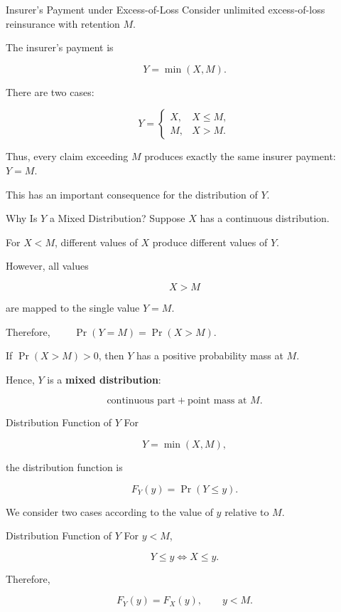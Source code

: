 \documentclass[
  ignorenonframetext,
  aspectratio=169,
]{beamer}
\begin{document}
\begin{frame}{Insurer's Payment under Excess-of-Loss}
\protect{}\label{insurers-payment-under-excess-of-loss-1}
Consider unlimited excess-of-loss reinsurance with retention \(M\).

The insurer's payment is

\[
\boxed{Y=\min(X,M)}.
\]

There are two cases:

\[
Y=
\begin{cases}
X, & X\leq M,\\
M, & X>M.
\end{cases}
\]

Thus, every claim exceeding \(M\) produces exactly the same insurer
payment: \(Y=M.\)

This has an important consequence for the distribution of \(Y\).
\end{frame}

\begin{frame}{Why Is \(Y\) a Mixed Distribution?}
\protect{}\label{why-is-y-a-mixed-distribution}
Suppose \(X\) has a continuous distribution.

For \(X<M\), different values of \(X\) produce different values of
\(Y\).

However, all values

\[
X>M
\]

are mapped to the single value \(Y = M.\)

Therefore, \(\quad \quad \Pr(Y=M)=\Pr(X>M).\)

If \(\Pr(X>M)>0\), then \(Y\) has a positive probability mass at \(M\).

Hence, \(Y\) is a \textbf{mixed distribution}:

\[
\boxed{
\text{continuous part}
+
\text{point mass at }M.
}
\]
\end{frame}

\begin{frame}{Distribution Function of \(Y\)}
\protect{}\label{distribution-function-of-y}
For

\[
Y=\min(X,M),
\]

the distribution function is

\[
F_Y(y)=\Pr(Y\leq y).
\]

We consider two cases according to the value of \(y\) relative to \(M\).
\end{frame}

\begin{frame}{Distribution Function of \(Y\)}
\protect{}\label{distribution-function-of-y-1}
For \(y<M\),

\[
Y\leq y
\iff
X\leq y.
\]

Therefore,

\[
\boxed{
F_Y(y)=F_X(y),
\qquad y<M.
}
\]
\end{frame}
\end{document}
